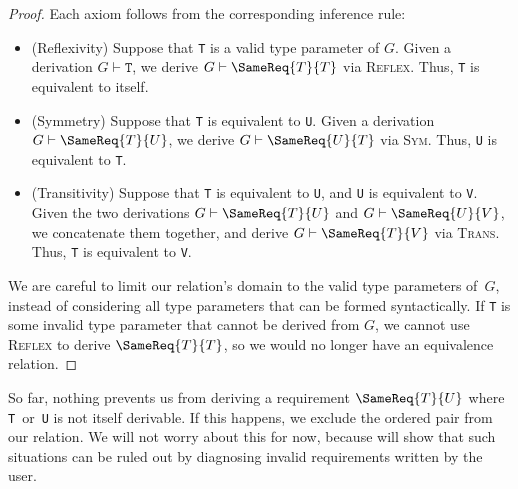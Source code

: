 \documentclass[../generics]{subfiles}
\begin{document}
\begin{proof}
Each axiom follows from the corresponding inference rule:
\begin{itemize}
\item
(Reflexivity) Suppose that \texttt{T} is a valid type parameter of $G$. Given a derivation $G\vdash\texttt{T}$, we derive $G\vdash\SameReq{T}{T}$ via \textsc{Reflex}. Thus, \texttt{T} is equivalent to itself.
\item
(Symmetry) Suppose that \texttt{T} is equivalent to \texttt{U}. Given a derivation $G\vdash\SameReq{T}{U}$, we derive $G\vdash\SameReq{U}{T}$ via \textsc{Sym}. Thus, \texttt{U} is equivalent to \texttt{T}.
\item
(Transitivity) Suppose that \texttt{T} is equivalent to \texttt{U}, and \texttt{U} is equivalent to \texttt{V}. Given the two derivations $G\vdash\SameReq{T}{U}$ and $G\vdash\SameReq{U}{V}$, we concatenate them together, and derive $G\vdash\SameReq{T}{V}$ via \textsc{Trans}. Thus, \texttt{T} is equivalent to \texttt{V}.
\end{itemize}

We are careful to limit our relation's domain to the valid type parameters of~$G$, instead of considering all type parameters that can be formed syntactically. If \texttt{T} is some invalid type parameter that cannot be derived from $G$, we cannot use \textsc{Reflex} to derive $\SameReq{T}{T}$, so we would no longer have an equivalence relation.
\end{proof}

So far, nothing prevents us from deriving a requirement $\SameReq{T}{U}$ where \texttt{T}~or~\texttt{U} is not itself derivable. If this happens, we exclude the ordered pair from our relation. We will not worry about this for now, because  will show that such situations can be ruled out by diagnosing invalid requirements written by the user.
\end{document}
